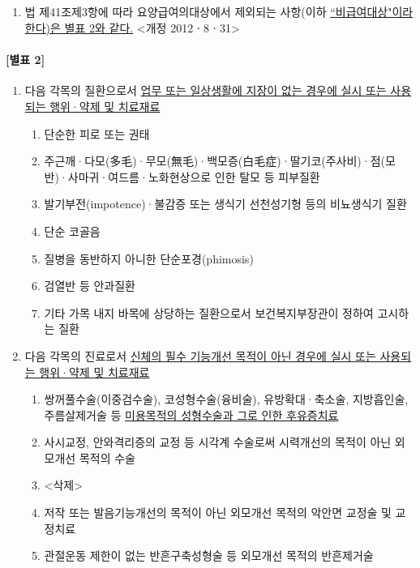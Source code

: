 \subsection{}
\begin{enumerate}[①]\tightlist
\item 법 제41조제3항에 따라 요양급여의대상에서 제외되는 사항(이하 \uline{``비급여대상"이라 한다)은 별표 2와 같다.} <개정 2012ㆍ8ㆍ31>
\end{enumerate}

\paragraph{[별표 2]}
\begin{enumerate}[1.]\tightlist
\item 다음 각목의 질환으로서 \uline{업무 또는 일상생활에 지장이 없는 경우에 실시 또는 사용되는 행위·약제 및 치료재료}
	\begin{enumerate}[가.]\tightlist
	\item 단순한 피로 또는 권태
	\item 주근깨·다모(多毛)·무모(無毛)·백모증(白毛症)·딸기코(주사비)·점(모반)·사마귀·여드름·노화현상으로 인한 탈모 등 피부질환
	\item 발기부전(impotence)·불감증 또는 생식기 선천성기형 등의 비뇨생식기 질환
	\item 단순 코골음
	\item 질병을 동반하지 아니한 단순포경(phimosis)
	\item 검열반 등 안과질환
	\item 기타 가목 내지 바목에 상당하는 질환으로서 보건복지부장관이 정하여 고시하는 질환
	\end{enumerate}
\item 다음 각목의 진료로서 \uline{신체의 필수 기능개선 목적이 아닌 경우에 실시 또는 사용되는 행위·약제 및 치료재료}
	\begin{enumerate}[가.]\tightlist
	\item 쌍꺼풀수술(이중검수술), 코성형수술(융비술), 유방확대·축소술, 지방흡인술, 주름살제거술 등 \uline{미용목적의 성형수술과 그로 인한 후유증치료}
	\item 사시교정, 안와격리증의 교정 등 시각계 수술로써 시력개선의 목적이 아닌 외모개선 목적의 수술
	\item <삭제>
	\item 저작 또는 발음기능개선의 목적이 아닌 외모개선 목적의 악안면 교정술 및 교정치료
	\item 관절운동 제한이 없는 반흔구축성형술 등 외모개선 목적의 반흔제거술

\end{enumerate}
\end{enumerate}
